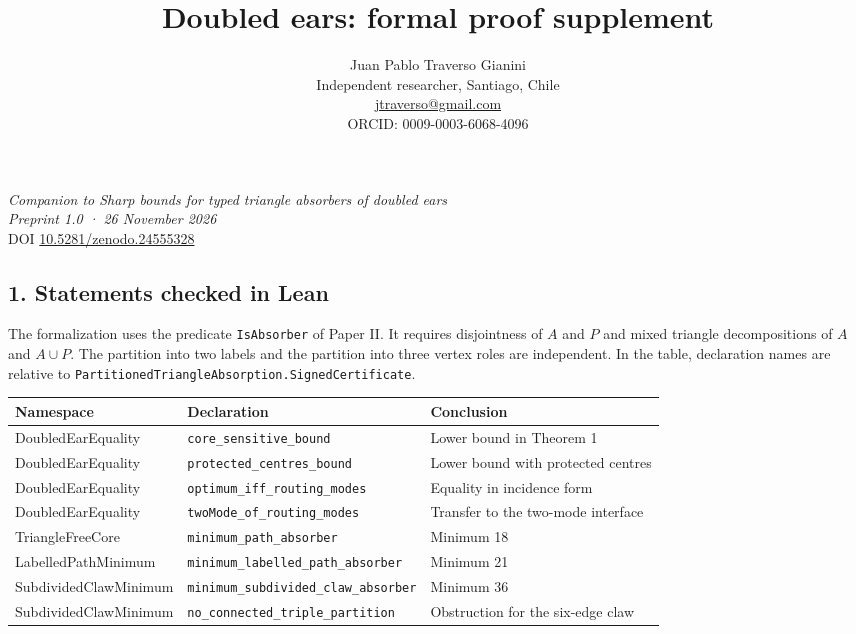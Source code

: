 \documentclass[english,11pt,a4paper]{article}
\title{Doubled ears: formal proof supplement}
\author{Juan Pablo Traverso Gianini\\
\small Independent researcher, Santiago, Chile\\
\small \href{mailto:jtraverso@gmail.com}{jtraverso@gmail.com}\\
\small ORCID: 0009-0003-6068-4096}
\date{}
\newcounter{none}
\begin{document}
\raggedbottom
\maketitle
\emph{Companion to Sharp bounds for typed triangle absorbers of doubled ears}\\
\emph{Preprint 1.0 · 26 November 2026}\\
DOI \href{https://doi.org/10.5281/zenodo.24555328}{10.5281/zenodo.24555328}

\subsection{1. Statements checked in Lean}\label{statements-checked-in-lean}

The formalization uses the predicate \texttt{IsAbsorber} of Paper II. It requires disjointness of \(A\) and \(P\) and mixed triangle decompositions of \(A\) and \(A\cup P\). The partition into two labels and the partition into three vertex roles are independent. In the table, declaration names are relative to \texttt{PartitionedTriangleAbsorption.SignedCertificate}.

{\def\LTcaptype{none} %
\begin{longtable}[]{@{}
  >{\raggedright\arraybackslash}p{}
  >{\raggedright\arraybackslash}p{}
  >{\raggedright\arraybackslash}p{}@{}}
\toprule\noalign{}
\begin{minipage}[b]{\linewidth}\raggedright
Namespace
\end{minipage} & \begin{minipage}[b]{\linewidth}\raggedright
Declaration
\end{minipage} & \begin{minipage}[b]{\linewidth}\raggedright
Conclusion
\end{minipage} \\
\midrule\noalign{}
\endhead
\bottomrule\noalign{}
\endlastfoot
DoubledEarEquality & \texttt{core\_sensitive\_bound} & Lower bound in Theorem 1 \\
DoubledEarEquality & \texttt{protected\_centres\_bound} & Lower bound with protected centres \\
DoubledEarEquality & \texttt{optimum\_iff\_routing\_modes} & Equality in incidence form \\
DoubledEarEquality & \texttt{twoMode\_of\_routing\_modes} & Transfer to the two-mode interface \\
TriangleFreeCore & \texttt{minimum\_path\_absorber} & Minimum 18 \\
LabelledPathMinimum & \texttt{minimum\_labelled\_path\_absorber} & Minimum 21 \\
SubdividedClawMinimum & \texttt{minimum\_subdivided\_claw\_absorber} & Minimum 36 \\
SubdividedClawMinimum & \texttt{no\_connected\_triple\_partition} & Obstruction for the six-edge claw \\
\end{longtable}
}
\end{document}
